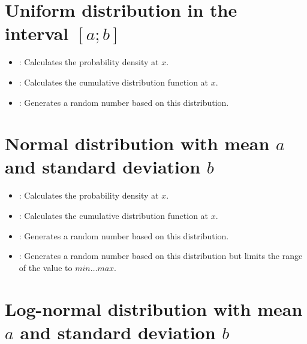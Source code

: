 \section{Uniform distribution in the interval \texorpdfstring{$[a;b]$}{[a;b]}}

\begin{itemize}

\item
{}:
Calculates the probability density at $x$.

\item
{}:
Calculates the cumulative distribution function at $x$.

\item
{}:
Generates a random number based on this distribution.

\end{itemize}



\section{Normal distribution with mean \texorpdfstring{$a$}{a} and standard deviation \texorpdfstring{$b$}{b}}

\begin{itemize}

\item
{}:
Calculates the probability density at $x$.

\item
{}:
Calculates the cumulative distribution function at $x$.

\item
{}:
Generates a random number based on this distribution.

\item
{}:
Generates a random number based on this distribution but limits the range of the value to $min\ldots max$.

\end{itemize}



\section{Log-normal distribution with mean \texorpdfstring{$a$}{a} and standard deviation \texorpdfstring{$b$}{b}}

